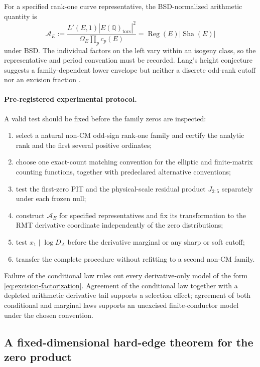 \documentclass[11pt,reqno]{amsart}
\theoremstyle{remark}
\newcommand{\Q}{\mathbb{Q}}
\newcommand{\ShaE}{\mathop{\mathrm{Sha}}}
\newcommand{\Reg}{\operatorname{Reg}}
\begin{document}
For a specified rank-one curve representative, the BSD-normalized arithmetic quantity is
\begin{equation}
  \mathcal A_E
  :=\frac{L'(E,1)|E(\Q)_{\mathrm{tors}}|^2}
  {\Omega_E\prod_p c_p(E)}
  =\Reg(E)|\ShaE(E)|
  \label{eq:arithmetic-reduced-derivative}
\end{equation}
under BSD.  The individual factors on the left vary within an isogeny class, so the representative and period convention must be recorded.  Lang's height conjecture suggests a family-dependent lower envelope but neither a discrete odd-rank cutoff nor an excision fraction \cite{HindrySilverman1988,Silverman2010}.

\paragraph{Pre-registered experimental protocol.}
A valid test should be fixed before the family zeros are inspected:
\begin{enumerate}[leftmargin=1.6em,itemsep=0.3em]
  \item select a natural non-CM odd-sign rank-one family and certify the analytic rank and the first several positive ordinates;
  \item choose one exact-count matching convention for the elliptic and finite-matrix counting functions, together with predeclared alternative conventions;
  \item test the first-zero PIT and the physical-scale residual product $J_{2:5}$ separately under each frozen null;
  \item construct $\mathcal A_E$ for specified representatives and fix its transformation to the RMT derivative coordinate independently of the zero distributions;
  \item test $x_1\mid\log D_A$ before the derivative marginal or any sharp or soft cutoff;
  \item transfer the complete procedure without refitting to a second non-CM family.
\end{enumerate}
Failure of the conditional law rules out every derivative-only model of the form \eqref{eq:excision-factorization}.  Agreement of the conditional law together with a depleted arithmetic derivative tail supports a selection effect; agreement of both conditional and marginal laws supports an unexcised finite-conductor model under the chosen convention.

\subsection{A fixed-dimensional hard-edge theorem for the zero product}
\label{sec:hard-edge-tail}
\end{document}
